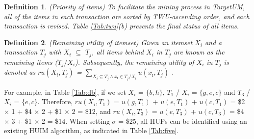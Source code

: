 \documentclass[journal]{IEEEtran}
\newtheorem{definition}{Definition}[section]
\begin{document}
\begin{definition}
	\rm (\textit{Priority of items}) To facilitate the mining process in TargetUM, all of the items in each transaction are sorted by \textit{TWU}-ascending order, and each transaction is revised. Table \ref{Tab:twu}(b) presents the final status of all items.
\end{definition}

\begin{definition}
	\rm  (\textit{Remaining utility of itemset}) Given an itemset $X_i$ and a transaction $T_j$ with $X_i$ $\subseteq$ $T_j$, all items behind $X_i$ in $T_j$ are known as the remaining items ($T_j / X_i$). Subsequently, the remaining utility of $X_i$ in $T_j$ is denoted as $ru(X_i,T_j)$ = $\sum_{X_i\subseteq T_j \wedge x_\imath \in T_j/X_i}$$u(x_\imath, T_j)$ \cite{liu2012mining}.
\end{definition}

For example, in Table \ref{Tab:db}, if we set $X_i$ = $\{b, h\}$, $T_1$ / $X_i$ = $\{g, e, c\}$ and $T_3$ / $X_i$ = $\{e, c\}$. Therefore, $ru(X_i, T_1)$ = $u(g,T_1)$ + $u(e,T_1)$ + $u(c,T_1)$ = \$2 $\times$ 1 + \$4 $\times$ 2 + \$1 $\times$ 2 = \$12, and $ru(X_i, T_3)$ = $u(e,T_3)$ + $u(c,T_3)$ = \$4 $\times$ 3 + \$1 $\times$ 2 = \$14. When setting $\sigma$ = \$25, all HUPs can be identified using an existing HUIM algorithm, as indicated in Table \ref{Tab:five}.
\end{document}
